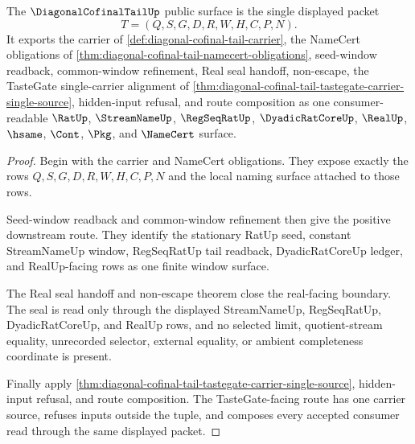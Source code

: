\begin{theorem}
\label{thm:diagonal-cofinal-tail-public-export}
The $\DiagonalCofinalTailUp$ public surface is the single displayed packet
$$
T=(Q,S,G,D,R,W,H,C,P,N).
$$
It exports the carrier of \autoref{def:diagonal-cofinal-tail-carrier}, the NameCert obligations of \autoref{thm:diagonal-cofinal-tail-namecert-obligations}, seed-window readback, common-window refinement, Real seal handoff, non-escape, the TasteGate single-carrier alignment of \autoref{thm:diagonal-cofinal-tail-tastegate-carrier-single-source}, hidden-input refusal, and route composition as one consumer-readable $\RatUp$, $\StreamNameUp$, $\RegSeqRatUp$, $\DyadicRatCoreUp$, $\RealUp$, $\hsame$, $\Cont$, $\Pkg$, and $\NameCert$ surface.
\end{theorem}
\begin{proof}
Begin with the carrier and NameCert obligations. They expose exactly the rows $Q,S,G,D,R,W,H,C,P,N$ and the local naming surface attached to those rows.

Seed-window readback and common-window refinement then give the positive downstream route. They identify the stationary RatUp seed, constant StreamNameUp window, RegSeqRatUp tail readback, DyadicRatCoreUp ledger, and RealUp-facing rows as one finite window surface.

The Real seal handoff and non-escape theorem close the real-facing boundary. The seal is read only through the displayed StreamNameUp, RegSeqRatUp, DyadicRatCoreUp, and RealUp rows, and no selected limit, quotient-stream equality, unrecorded selector, external equality, or ambient completeness coordinate is present.

Finally apply \autoref{thm:diagonal-cofinal-tail-tastegate-carrier-single-source}, hidden-input refusal, and route composition. The TasteGate-facing route has one carrier source, refuses inputs outside the tuple, and composes every accepted consumer read through the same displayed packet.
\end{proof}

